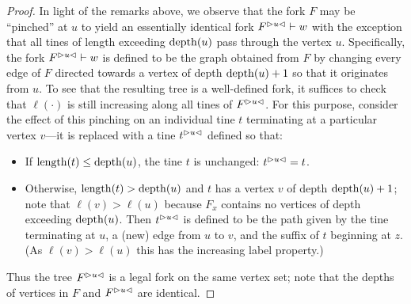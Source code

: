 \begin{proof}
    

     

    In light of the remarks above, we observe that the fork $F$ may be
    ``pinched'' at $u$ to yield an essentially identical fork
    $\pinch{u}{F} \vdash w$ with the exception that all tines of length
    exceeding $\depth(u)$ pass through the vertex $u$. Specifically, the
    fork $\pinch{u}{F} \vdash w$ is defined to be the graph obtained
    from $F$ by changing every edge of $F$ directed towards a vertex of
    depth $\depth(u) + 1$ so that it originates from $u$. To see that
    the resulting tree is a well-defined fork, it suffices to check that
    $\ell(\cdot)$ is still increasing along all tines of
    $\pinch{u}{F}$. For this purpose, consider the effect of this
    pinching on an individual tine $t$ terminating at a particular
    vertex $v$---it is replaced with a tine $\pinch{u}{t}$ defined so
    that:
    \begin{itemize}
    \item If $\length(t) \leq \depth(u)$, the tine $t$ is unchanged:
      $\pinch{u}{t} = t$.
    \item Otherwise, $\length(t) > \depth(u)$ and $t$ has a vertex $v$
      of depth $\depth(u) + 1$; note that $\ell(v) > \ell(u)$ because
      $F_x$ contains no vertices of depth exceeding $\depth(u)$. Then
      $\pinch{u}{t}$ is defined to be the path given by the tine
      terminating at $u$, a (new) edge from $u$ to $v$, and the suffix
      of $t$ beginning at $z$. (As $\ell(v) > \ell(u)$ this has the
      increasing label property.)
    \end{itemize}
    Thus the tree $\pinch{u}{F}$ is a legal fork on the same vertex set;
    note that the depths of vertices in $F$ and $\pinch{u}{F}$ are
    identical.
    

\end{proof}

